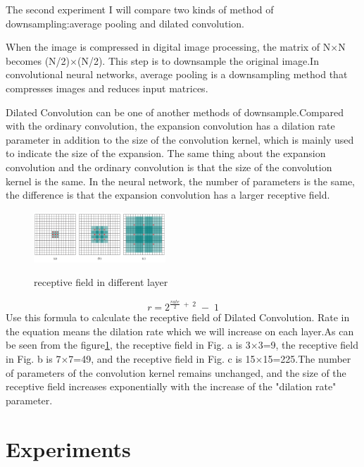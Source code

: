\documentclass{article}
\begin{document}
The second experiment I will compare two kinds of method of downsampling:average pooling and dilated convolution.

When the image is compressed in digital image processing, the matrix of N$\times$N becomes (N/2)$\times$(N/2). This step is to downsample the original image.In convolutional neural networks, average pooling is a downsampling method that compresses images and reduces input matrices.

Dilated Convolution can be one of another methods of downsample.Compared with the ordinary convolution, the expansion convolution has a dilation rate parameter in addition to the size of the convolution kernel, which is mainly used to indicate the size of the expansion. The same thing about the expansion convolution and the ordinary convolution is that the size of the convolution kernel is the same. In the neural network, the number of parameters is the same, the difference is that the expansion convolution has a larger receptive field\cite{DBLP:journals/corr/YuK15}.
\begin{figure}[H] %
	\centering %
	\includegraphics[width=0.44\textwidth]{./pic/part2/kongdongjuanji.png} %
	\caption{receptive field in different layer} %
	\label{Fig.main2} %
	\cite{DBLP:journals/corr/YuK15}
\end{figure}

\begin{equation}
r=2^{\frac{rate}2\;+\;2}\;-\;1
\end{equation}
Use this formula to calculate the receptive field of Dilated Convolution. Rate in the equation means the dilation rate which we will increase  on each layer.As can be seen from the figure\ref{Fig.main2}, the receptive field in Fig. a is 3$\times$3=9, the receptive field in Fig. b is 7$\times$7=49, and the receptive field in Fig. c is 15$\times$15=225.The number of parameters of the convolution kernel remains unchanged, and the size of the receptive field increases exponentially with the increase of the "dilation rate" parameter.


\section{Experiments}
\end{document}
